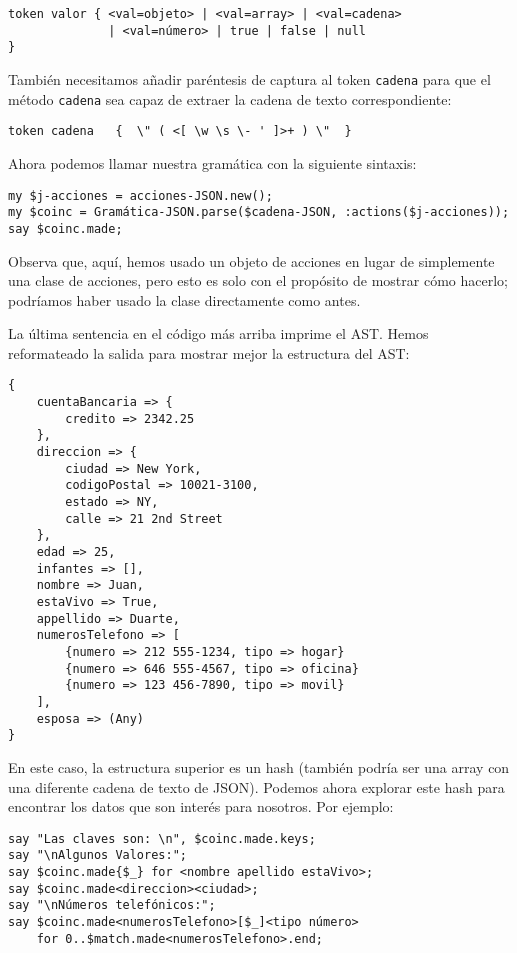 \begin{verbatim}
token valor { <val=objeto> | <val=array> | <val=cadena> 
              | <val=número> | true | false | null
}
\end{verbatim}

También necesitamos añadir paréntesis de captura al token {\tt cadena}
para que el método {\tt cadena} sea capaz de extraer la cadena de texto
correspondiente:

\begin{verbatim}
token cadena   {  \" ( <[ \w \s \- ' ]>+ ) \"  }
\end{verbatim}

Ahora podemos llamar nuestra gramática con la siguiente sintaxis:

\begin{verbatim}
my $j-acciones = acciones-JSON.new();
my $coinc = Gramática-JSON.parse($cadena-JSON, :actions($j-acciones));
say $coinc.made;
\end{verbatim}

Observa que, aquí, hemos usado un objeto de acciones en lugar
de simplemente una clase de acciones, pero esto es solo con 
el propósito de mostrar cómo hacerlo; podríamos haber usado
la clase directamente como antes.

La última sentencia en el código más arriba imprime el AST.
Hemos reformateado la salida para mostrar mejor la estructura
del AST:


\begin{verbatim}
{
    cuentaBancaria => {
        credito => 2342.25
    }, 
    direccion => {
        ciudad => New York, 
        codigoPostal => 10021-3100, 
        estado => NY, 
        calle => 21 2nd Street
    }, 
    edad => 25, 
    infantes => [], 
    nombre => Juan, 
    estaVivo => True, 
    appellido => Duarte, 
    numerosTelefono => [
        {numero => 212 555-1234, tipo => hogar} 
        {numero => 646 555-4567, tipo => oficina} 
        {numero => 123 456-7890, tipo => movil}
    ], 
    esposa => (Any)
}
\end{verbatim}

En este caso, la estructura superior es un hash (también podría ser una array
con una diferente cadena de texto de JSON). Podemos ahora explorar
este hash para encontrar los datos que son interés para nosotros.
Por ejemplo:

\begin{verbatim}
say "Las claves son: \n", $coinc.made.keys;
say "\nAlgunos Valores:";
say $coinc.made{$_} for <nombre apellido estaVivo>;
say $coinc.made<direccion><ciudad>;
say "\nNúmeros telefónicos:";
say $coinc.made<numerosTelefono>[$_]<tipo número> 
    for 0..$match.made<numerosTelefono>.end;
\end{verbatim}

